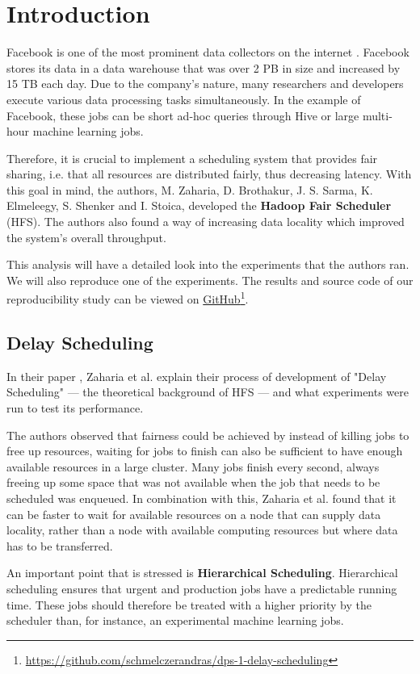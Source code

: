\section{Introduction}

Facebook is one of the most prominent data collectors on the internet \cite{DwyerTim2016Cmap}. Facebook stores its data in a data warehouse that was over 2 PB in size and increased by 15 TB each day. Due to the company's nature, many researchers and developers execute various data processing tasks simultaneously. In the example of Facebook, these jobs can be short ad-hoc queries through Hive \cite{thusoo2009hive} or large multi-hour machine learning jobs. 

Therefore, it is crucial to implement a scheduling system that provides fair sharing, i.e. that all resources are distributed fairly, thus decreasing latency. With this goal in mind, the authors, M. Zaharia, D. Brothakur, J. S. Sarma, K. Elmeleegy, S. Shenker and I. Stoica, developed the \textbf{Hadoop Fair Scheduler} (HFS). The authors also found a way of increasing data locality which improved the system's overall throughput.

This analysis will have a detailed look into the experiments that the authors ran. We will also reproduce one of the experiments. The results and source code of our reproducibility study can be viewed on \href{https://github.com/schmelczerandras/dps-1-delay-scheduling}{GitHub}\footnote{\href{https://github.com/schmelczerandras/dps-1-delay-scheduling}{https://github.com/schmelczerandras/dps-1-delay-scheduling}}.
\\
\subsection{Delay Scheduling}

In their paper \cite{ds}, Zaharia et al. explain their process of development of "Delay Scheduling" --- the theoretical background of HFS --- and what experiments were run to test its performance.

The authors observed that fairness could be achieved by instead of killing jobs to free up resources, waiting for jobs to finish can also be sufficient to have enough available resources in a large cluster. Many jobs finish every second, always freeing up some space that was not available when the job that needs to be scheduled was enqueued. In combination with this, Zaharia et al. found that it can be faster to wait for available resources on a node that can supply data locality, rather than a node with available computing resources but where data has to be transferred.

An important point that is stressed is \textbf{Hierarchical Scheduling}. Hierarchical scheduling ensures that urgent and production jobs have a predictable running time. These jobs should therefore be treated with a higher priority by the scheduler than, for instance, an experimental machine learning jobs.
